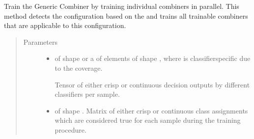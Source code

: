 \documentclass[letterpaper,10pt,english]{sphinxmanual}
\begin{document}
\begin{fulllineitems}
\begin{fulllineitems}
\label{\detokenize{pusion.auto.auto_combiner:pusion.auto.auto_combiner.AutoCombiner.train_par}}
\sphinxAtStartPar
Train the Generic Combiner by training individual combiners in parallel.
This method detects the configuration based on the  and trains all trainable combiners
that are applicable to this configuration.
\begin{quote}\begin{description}
\item[{Parameters}] \leavevmode\begin{itemize}
\item {} 
\sphinxAtStartPar
{} \textendash{} 
\sphinxAtStartPar
{} of shape  or a  of
 elements of shape , where  is classifier\sphinxhyphen{}specific
due to the coverage.

\sphinxAtStartPar
Tensor of either crisp or continuous decision outputs by different classifiers per sample.


\item {} 
\sphinxAtStartPar
{} \textendash{}  of shape .
Matrix of either crisp or continuous class assignments which are considered true for each sample during
the training procedure.

\end{itemize}

\end{description}\end{quote}

\end{fulllineitems}



\end{fulllineitems}
\end{document}

